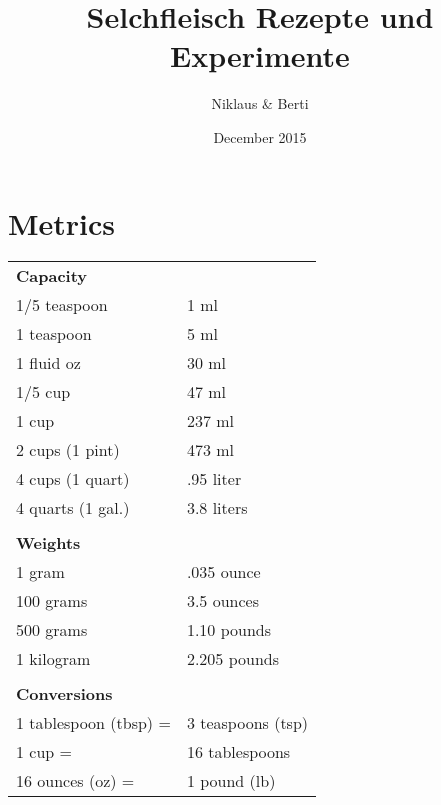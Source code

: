 \documentclass{article}
\author{Niklaus \& Berti}
\date{December 2015}
\title{Selchfleisch Rezepte und Experimente}
\begin{document}
\maketitle{}
\pagebreak
\tableofcontents

\pagebreak

\section{Metrics}
\begin{tabular}{ l | l  }
\multicolumn{2}{l}{\textbf{Capacity}}  \\
1/5 teaspoon 	& 1 ml	\\
1 teaspoon 	& 5 ml	\\
1 fluid oz	&30 ml	 \\	 
1/5 cup 	&47 ml	 \\	 
1 cup 	&237 ml	 	\\ 
2 cups (1 pint) &	473 ml	 	\\ 
4 cups (1 quart) &	.95 liter	\\ 	 
4 quarts (1 gal.) &	3.8 liters	\\ 	 
\multicolumn{2}{c}{} \\
\multicolumn{2}{l}{\textbf{Weights}} \\
1 gram &	.035 ounce\\
100 grams& 	3.5 ounces\\
500 grams&	1.10 pounds\\
1 kilogram &	2.205 pounds \\
\multicolumn{2}{c}{} \\
\multicolumn{2}{l}{\textbf{Conversions}} \\
1 tablespoon (tbsp) =& 	3 teaspoons (tsp)\\
1 cup =& 	16 tablespoons\\
16 ounces (oz) = &	1 pound (lb)
\end{tabular}


\pagebreak



\pagebreak
\end{document}
